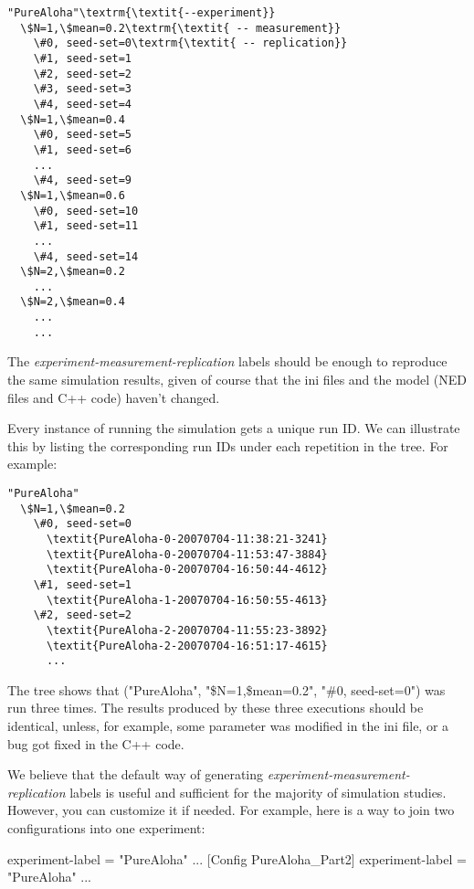 \begin{Verbatim}[commandchars=\\\{\}]
"PureAloha"\textrm{\textit{--experiment}}
  \$N=1,\$mean=0.2\textrm{\textit{ -- measurement}}
    \#0, seed-set=0\textrm{\textit{ -- replication}}
    \#1, seed-set=1
    \#2, seed-set=2
    \#3, seed-set=3
    \#4, seed-set=4
  \$N=1,\$mean=0.4
    \#0, seed-set=5
    \#1, seed-set=6
    ...
    \#4, seed-set=9
  \$N=1,\$mean=0.6
    \#0, seed-set=10
    \#1, seed-set=11
    ...
    \#4, seed-set=14
  \$N=2,\$mean=0.2
    ...
  \$N=2,\$mean=0.4
    ...
    ...
\end{Verbatim}

The \textit{experiment-measurement-replication} labels should be enough to
reproduce the same simulation results, given of course that the ini
files and the model (NED files and C++ code) haven't changed.

Every instance of running the simulation gets a unique run ID. We can
illustrate this by listing the corresponding run IDs under each
repetition in the tree. For example:

\begin{Verbatim}[commandchars=\\\{\}]
"PureAloha"
  \$N=1,\$mean=0.2
    \#0, seed-set=0
      \textit{PureAloha-0-20070704-11:38:21-3241}
      \textit{PureAloha-0-20070704-11:53:47-3884}
      \textit{PureAloha-0-20070704-16:50:44-4612}
    \#1, seed-set=1
      \textit{PureAloha-1-20070704-16:50:55-4613}
    \#2, seed-set=2
      \textit{PureAloha-2-20070704-11:55:23-3892}
      \textit{PureAloha-2-20070704-16:51:17-4615}
      ...
\end{Verbatim}

The tree shows that ("PureAloha", "\$N=1,\$mean=0.2", "\#0, seed-set=0")
was run three times. The results produced
by these three executions should be identical, unless, for example,
some parameter was modified in the ini file, or a bug got fixed in the
C++ code.

We believe that the default way of generating
\textit{experiment-measurement-replication} labels is useful and
sufficient for the majority of simulation studies. However, you can
customize it if needed. For example, here is a way to join two
configurations into one experiment:

\begin{inifile}
experiment-label = "PureAloha"
...
[Config PureAloha_Part2]
experiment-label = "PureAloha"
...
\end{inifile}

